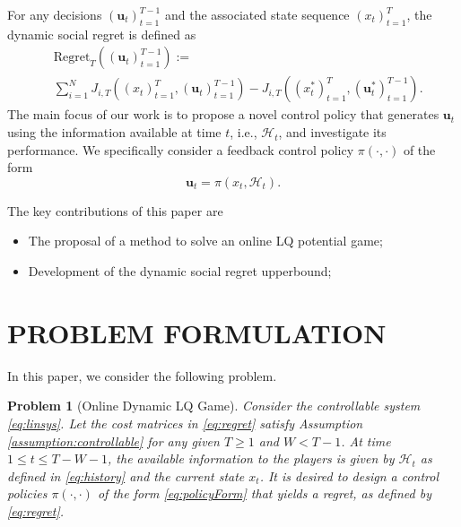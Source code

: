 \documentclass{article}
\newtheorem{problem}{Problem}
\begin{document}
For any decisions $(\mathbf{u}_{t})_{t=1}^{T-1}$ and the associated state sequence $(x_{t})_{t=1}^{T}$, the dynamic social regret is defined as
\begin{equation}
    \begin{split}
        &\text{Regret}_{T}((\mathbf{u}_{t})_{t=1}^{T-1}) := \\
        &\sum_{i=1}^{N} J_{i,T}((x_{t})_{t=1}^{T},(\mathbf{u}_{t})_{t=1}^{T-1}) - J_{i,T}((x_{t}^{*})_{t=1}^{T},(\mathbf{u}_{t}^{*})_{t=1}^{T-1}).
    \end{split}
\end{equation}
The main focus of our work is to propose a novel control policy that generates $\mathbf{u}_{t}$ using the information available at time $t$, i.e., $\mathcal{H}_{t}$, and investigate its performance. We specifically consider a feedback control policy $\pi(\cdot,\cdot)$ of the form 
\begin{equation}\label{eq:policyForm}
    \mathbf{u}_{t} = \pi(x_{t}, \mathcal{H}_{t}).
\end{equation}

The key contributions of this paper are
\begin{itemize}
    \item The proposal of a method to solve an online LQ potential game;
    \item Development of the dynamic social regret upperbound;
\end{itemize}


\section{PROBLEM FORMULATION}


In this paper, we consider the following problem.
\begin{problem}[Online Dynamic LQ Game]
     Consider the controllable system \eqref{eq:linsys}. Let the cost matrices in \eqref{eq:regret} satisfy Assumption \ref{assumption:controllable} for any given $T \geq 1$ and $W < T-1$. At time $1 \leq t \leq T-W-1$, the available information to the players is given by $\mathcal{H}_{t}$ as defined in \eqref{eq:history} and the current state $x_{t}$. It is desired to design a control policies $\pi(\cdot, \cdot)$ of the form \eqref{eq:policyForm} that yields a regret, as defined by \eqref{eq:regret}.
\end{problem}
\end{document}
